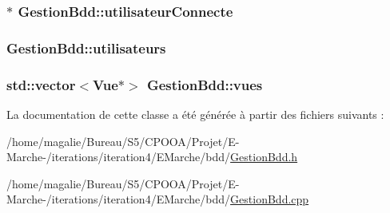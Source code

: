 \hypertarget{class_gestion_bdd_adb07bb1f3015855aef7bcfe0b278ebd7}{
\subsubsection[{utilisateur\-Connecte}]{$\ast$ Gestion\-Bdd\-::utilisateur\-Connecte\hspace{0.3cm}{\ttfamily [protected]}}}\label{class_gestion_bdd_adb07bb1f3015855aef7bcfe0b278ebd7}
\hypertarget{class_gestion_bdd_a43b0bcad5d1eb6ff51c78ceb6cdd972c}{
\subsubsection[{utilisateurs}]{ Gestion\-Bdd\-::utilisateurs\hspace{0.3cm}{\ttfamily [protected]}}}\label{class_gestion_bdd_a43b0bcad5d1eb6ff51c78ceb6cdd972c}
\hypertarget{class_gestion_bdd_a44ea1efd29c4996b1dcba0bf428051a7}{
\subsubsection[{vues}]{\setlength{\rightskip}{0pt plus 5cm}std\-::vector$<${\bf Vue}$\ast$$>$ Gestion\-Bdd\-::vues\hspace{0.3cm}{\ttfamily [protected]}}}\label{class_gestion_bdd_a44ea1efd29c4996b1dcba0bf428051a7}


La documentation de cette classe a été générée à partir des fichiers suivants \-:\begin{DoxyCompactItemize}
\item 
/home/magalie/\-Bureau/\-S5/\-C\-P\-O\-O\-A/\-Projet/\-E-\/\-Marche-\//iterations/iteration4/\-E\-Marche/bdd/\hyperlink{_gestion_bdd_8h}{Gestion\-Bdd.\-h}\item 
/home/magalie/\-Bureau/\-S5/\-C\-P\-O\-O\-A/\-Projet/\-E-\/\-Marche-\//iterations/iteration4/\-E\-Marche/bdd/\hyperlink{_gestion_bdd_8cpp}{Gestion\-Bdd.\-cpp}\end{DoxyCompactItemize}
